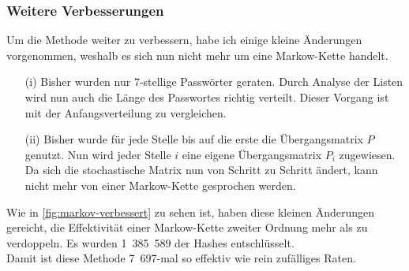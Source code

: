 \documentclass[12pt,a4paper]{scrartcl}
\newcommand{\spar}{\par\vspace{10pt}\noindent}
\numberwithin{equation}{section}
\numberwithin{myalgctr}{section}
\numberwithin{mytheoremctr}{section}
\begin{document}
	\subsubsection{Weitere Verbesserungen}
	Um die Methode weiter zu verbessern, habe ich einige kleine Änderungen vorgenommen, weshalb es sich nun nicht mehr um eine Markow-Kette handelt. 
	\begin{itemize}
		\item[(i)] Bisher wurden nur 7-stellige Passwörter geraten. Durch Analyse der Listen wird nun auch die Länge des Passwortes richtig verteilt. Dieser Vorgang ist mit der Anfangsverteilung zu vergleichen.
		\item[(ii)] Bisher wurde für jede Stelle bis auf die erste die Übergangsmatrix $P$ genutzt. Nun wird jeder Stelle $i$ eine eigene Übergangsmatrix $P_i$ zugewiesen. Da sich die stochastische Matrix nun von Schritt zu Schritt ändert, kann nicht mehr von einer Markow-Kette gesprochen werden.
	\end{itemize}

	\spar
	Wie in \cref{fig:markov-verbessert} zu sehen ist, haben diese kleinen Änderungen gereicht, die Effektivität einer Markow-Kette zweiter Ordnung mehr als zu verdoppeln. Es wurden 1~385~589 der Hashes entschlüsselt.\\
	Damit ist diese Methode 7~697-mal so effektiv wie rein zufälliges Raten.
		
	
	\newpage
\end{document}
